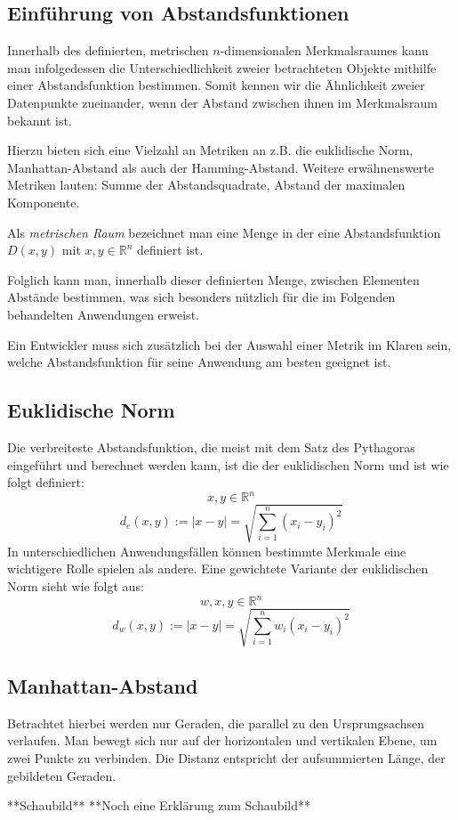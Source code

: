 \documentclass[a4paper]{scrartcl}
\begin{document}
\begin{multicols}{2}
            \subsection{Einführung von Abstandsfunktionen}
                Innerhalb des definierten, metrischen $n$-dimensionalen Merkmalsraumes kann man infolgedessen die Unterschiedlichkeit zweier betrachteten Objekte mithilfe einer Abstandsfunktion bestimmen. Somit kennen wir die Ähnlichkeit zweier Datenpunkte zueinander, wenn der Abstand zwischen ihnen im Merkmalsraum bekannt ist.\par Hierzu bieten sich eine Vielzahl an Metriken an z.B. die euklidische Norm, Manhattan-Abstand als auch der Hamming-Abstand. Weitere erwähnenswerte Metriken lauten: Summe der Abstandsquadrate, Abstand der maximalen Komponente.\par 
                Als \emph{metrischen Raum} bezeichnet man eine Menge in der eine Abstandsfunktion $D(x,y)$ mit $x,y \in \mathbb{R}^n$ definiert ist.\par
                Folglich kann man, innerhalb dieser definierten Menge, zwischen Elementen Abstände bestimmen, was sich besonders nützlich für die im Folgenden behandelten Anwendungen erweist. \par
                Ein Entwickler muss sich zusätzlich bei der Auswahl einer Metrik im Klaren sein, welche Abstandsfunktion für seine Anwendung am besten geeignet ist.
            \subsection{Euklidische Norm}
                Die verbreiteste Abstandsfunktion, die meist mit dem Satz des Pythagoras eingeführt und berechnet werden kann, ist die der euklidischen Norm und ist wie folgt definiert:
                $$ x,y \in \mathbb{R}^n $$
                $$
                    d_e(x,y):= |x - y| = \sqrt{\sum_{i=1}^{n}(x_i -y_i)^2}
                $$        
                In unterschiedlichen Anwendungsfällen können bestimmte Merkmale eine wichtigere Rolle spielen als andere.\cite{ertel2016_p207} Eine gewichtete Variante der euklidischen Norm sieht wie folgt aus:
                $$w,x,y \in \mathbb{R}^n $$
                $$
                    d_w(x,y):= |x - y| = \sqrt{\sum_{i=1}^{n}w_i(x_i -y_i)^2}
                $$     
            
            \subsection{Manhattan-Abstand}
                Betrachtet hierbei werden nur Geraden, die parallel zu den Ursprungsachsen verlaufen. Man bewegt sich nur auf der horizontalen und vertikalen Ebene, um zwei Punkte zu verbinden. Die Distanz entspricht der aufsummierten Länge, der gebildeten Geraden.\par
                **Schaubild**
                **Noch eine Erklärung zum Schaubild**\par
				

\end{multicols}
\end{document}
